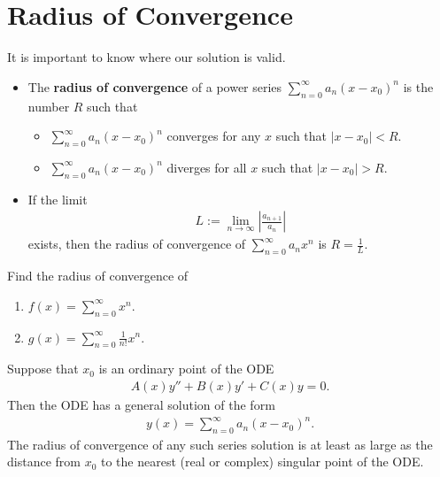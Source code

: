 \documentclass[12pt,a4paper]{article}
\newcommand{\ra}{\rightarrow}
\newcounter{example}[section]
\begin{document}
	\newpage
	
	\phantom{2}
	
	\newpage
	
	\section{Radius of Convergence}
	It is important to know where our solution is valid.
		
		\begin{itemize}
		\item The \textbf{radius of convergence} of a power series $\sum_{n = 0}^\infty a_n (x - x_0)^n$ is the number $R$ such that
			\begin{itemize}
			\item $\sum_{n = 0}^\infty a_n (x - x_0)^n$ converges for any $x$ such that $|x - x_0| < R$.
			\item $\sum_{n = 0}^\infty a_n (x - x_0)^n$ diverges for all $x$ such that $|x - x_0| > R$.
			\end{itemize}
		\item If the limit
			\begin{align*}
			L := \lim_{n \ra \infty} \left| \frac{a_{n+1}}{a_n} \right|
			\end{align*}
		exists, then the radius of convergence of $\sum_{n = 0}^\infty a_n x^n$ is $R = \frac{1}{L}$.
		\end{itemize}
	
	\vspace*{16pt}
	
	\begin{example}
	Find the radius of convergence of
		\begin{enumerate}[label=\textbf{(\alph*)}]
		\item $f(x) = \sum_{n =0}^\infty x^n$.
		\item $g(x) = \sum_{n = 0}^\infty \frac{1}{n!} x^n$.
		\end{enumerate}
	\end{example}
	
	\newpage
	
	\begin{theorem}
	Suppose that $x_0$ is an ordinary point of the ODE
		\begin{align*}
		A(x) y'' + B(x) y' + C(x) y = 0. 
		\end{align*}
	Then the ODE has a general solution of the form
		\begin{align*}
		y(x) = \sum_{n = 0}^\infty a_n (x - x_0)^n .
		\end{align*}
	The radius of convergence of any such series solution is at least as large as the distance from $x_0$ to the nearest (real or complex) singular point of the ODE.
	\end{theorem}
	
\end{document}
